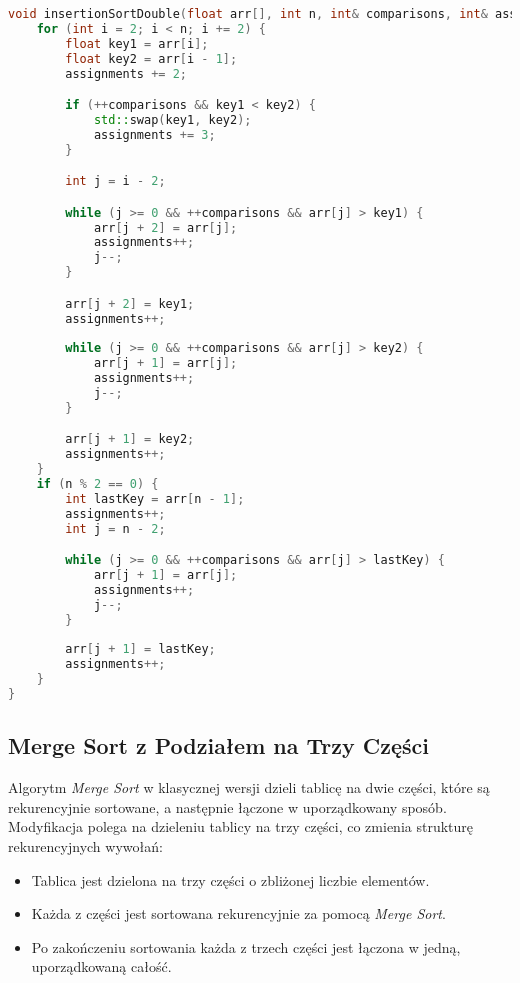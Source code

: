 \documentclass[a4paper,12pt]{article}
\begin{document}
\newpage
\begin{lstlisting}[language=C++,caption=Insertion Sort z wstawianiem dwóch elementów]
void insertionSortDouble(float arr[], int n, int& comparisons, int& assignments) {    
    for (int i = 2; i < n; i += 2) {
        float key1 = arr[i];
        float key2 = arr[i - 1];
        assignments += 2;

        if (++comparisons && key1 < key2) {
            std::swap(key1, key2);
            assignments += 3;
        }

        int j = i - 2;

        while (j >= 0 && ++comparisons && arr[j] > key1) {
            arr[j + 2] = arr[j];
            assignments++;
            j--;
        }

        arr[j + 2] = key1;
        assignments++;
        
        while (j >= 0 && ++comparisons && arr[j] > key2) {
            arr[j + 1] = arr[j];
            assignments++;
            j--;
        }

        arr[j + 1] = key2;
        assignments++;
    }
    if (n % 2 == 0) {
        int lastKey = arr[n - 1];
        assignments++;
        int j = n - 2;

        while (j >= 0 && ++comparisons && arr[j] > lastKey) {
            arr[j + 1] = arr[j];
            assignments++;
            j--;
        }
        
        arr[j + 1] = lastKey;
        assignments++;
    }
}

\end{lstlisting}

\subsection{Merge Sort z Podziałem na Trzy Części}
Algorytm \textit{Merge Sort} w klasycznej wersji dzieli tablicę na dwie części, które są rekurencyjnie sortowane, a następnie łączone w uporządkowany sposób. Modyfikacja polega na dzieleniu tablicy na trzy części, co zmienia strukturę rekurencyjnych wywołań:
\begin{itemize}
    \item Tablica jest dzielona na trzy części o zbliżonej liczbie elementów.
    \item Każda z części jest sortowana rekurencyjnie za pomocą \textit{Merge Sort}.
    \item Po zakończeniu sortowania każda z trzech części jest łączona w jedną, uporządkowaną całość.
\end{itemize}
\end{document}
